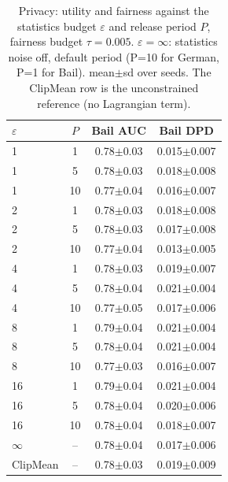 \begin{table}[t]
\centering
\footnotesize
\caption{Privacy: utility and fairness against the statistics budget $\varepsilon$ and release period $P$, fairness budget $\tau=0.005$. $\varepsilon=\infty$: statistics noise off, default period (P=10 for German, P=1 for Bail). mean$\pm$sd over seeds. The ClipMean row is the unconstrained reference (no Lagrangian term).}
\label{tab:e5b_privacy}
\begin{tabular}{lccc}
\toprule
$\varepsilon$ & $P$ & Bail AUC & Bail DPD \\
\midrule
1 & 1 & 0.78$\pm$0.03 & 0.015$\pm$0.007 \\
1 & 5 & 0.78$\pm$0.03 & 0.018$\pm$0.008 \\
1 & 10 & 0.77$\pm$0.04 & 0.016$\pm$0.007 \\
2 & 1 & 0.78$\pm$0.03 & 0.018$\pm$0.008 \\
2 & 5 & 0.78$\pm$0.03 & 0.017$\pm$0.008 \\
2 & 10 & 0.77$\pm$0.04 & 0.013$\pm$0.005 \\
4 & 1 & 0.78$\pm$0.03 & 0.019$\pm$0.007 \\
4 & 5 & 0.78$\pm$0.04 & 0.021$\pm$0.004 \\
4 & 10 & 0.77$\pm$0.05 & 0.017$\pm$0.006 \\
8 & 1 & 0.79$\pm$0.04 & 0.021$\pm$0.004 \\
8 & 5 & 0.78$\pm$0.04 & 0.021$\pm$0.004 \\
8 & 10 & 0.77$\pm$0.03 & 0.016$\pm$0.007 \\
16 & 1 & 0.79$\pm$0.04 & 0.021$\pm$0.004 \\
16 & 5 & 0.78$\pm$0.04 & 0.020$\pm$0.006 \\
16 & 10 & 0.78$\pm$0.04 & 0.018$\pm$0.007 \\
$\infty$ & -- & 0.78$\pm$0.04 & 0.017$\pm$0.006 \\
ClipMean & -- & 0.78$\pm$0.03 & 0.019$\pm$0.009 \\
\bottomrule
\end{tabular}
\end{table}
